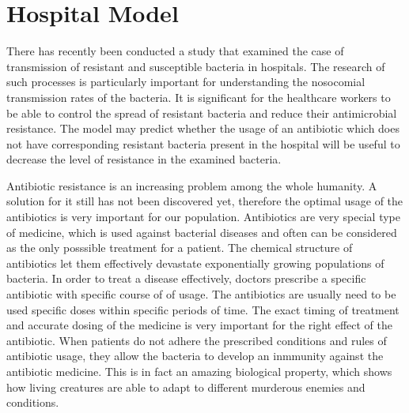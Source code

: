 \chapter*{Hospital Model}


There has recently been conducted a study that examined the case of transmission of resistant and susceptible bacteria in hospitals. The research of such processes is particularly important for understanding the nosocomial transmission rates of the bacteria. It is significant for the healthcare workers to be able to control the spread of resistant bacteria and reduce their antimicrobial resistance. The model may predict whether the usage of an antibiotic which does not have corresponding resistant bacteria present in the hospital will be useful to decrease the level of resistance in the examined bacteria.

Antibiotic resistance is an increasing problem among the whole humanity. A solution for it still has not been discovered yet, therefore the optimal usage of the antibiotics is very important for our population. Antibiotics are very special type of medicine, which is used against bacterial diseases and often can be considered as the only posssible treatment for a patient. The chemical structure of antibiotics let them effectively devastate exponentially growing populations of bacteria. In order to treat a disease effectively, doctors prescribe a specific antibiotic with specific course of of usage. The antibiotics are usually need to be used specific doses within specific periods of time. The exact timing of treatment and accurate dosing of the medicine is very important for the right effect of the antibiotic. When patients do not adhere the prescribed conditions and rules of antibiotic usage, they allow the bacteria to develop an inmmunity against the antibiotic medicine. This is in fact an amazing biological property, which shows how living creatures are able to adapt to different murderous enemies and conditions.

